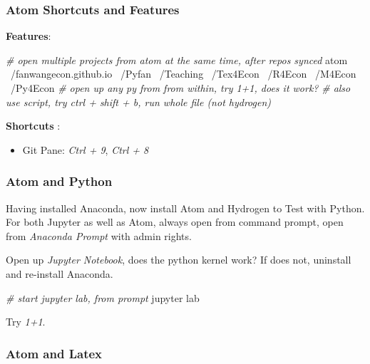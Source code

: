 \documentclass[]{article}
\newenvironment{Shaded}{\begin{snugshade}}{\end{snugshade}}
\newcommand{\CommentTok}[1]{\textcolor[rgb]{0.56,0.35,0.01}{\textit{#1}}}
\newcommand{\ExtensionTok}[1]{#1}
\newcommand{\NormalTok}[1]{#1}
\providecommand{\tightlist}{%
  \setlength{\itemsep}{0pt}\setlength{\parskip}{0pt}}
\begin{document}
\hypertarget{atom-shortcuts-and-features}{%
\subsubsection{Atom Shortcuts and
Features}\label{atom-shortcuts-and-features}}

\textbf{Features}:

\begin{Shaded}
\begin{Highlighting}[]
\CommentTok{# open multiple projects from atom at the same time, after repos synced}
\ExtensionTok{atom}\NormalTok{ ~/fanwangecon.github.io ~/Pyfan ~/Teaching ~/Tex4Econ ~/R4Econ ~/M4Econ ~/Py4Econ}
\CommentTok{# open up any py from from within, try 1+1, does it work?}
\CommentTok{# also use script, try ctrl + shift + b, run whole file (not hydrogen)}
\end{Highlighting}
\end{Shaded}

\textbf{Shortcuts} :

\begin{itemize}
\tightlist
\item
  Git Pane: \emph{Ctrl + 9}, \emph{Ctrl + 8}
\end{itemize}

\hypertarget{atom-and-python}{%
\subsubsection{Atom and Python}\label{atom-and-python}}

Having installed Anaconda, now install Atom and Hydrogen to Test with
Python. For both Jupyter as well as Atom, always open from command
prompt, open from \emph{Anaconda Prompt} with admin rights.

Open up \emph{Jupyter Notebook}, does the python kernel work? If does
not, uninstall and re-install Anaconda.

\begin{Shaded}
\begin{Highlighting}[]
\CommentTok{# start jupyter lab, from prompt}
\ExtensionTok{jupyter}\NormalTok{ lab}
\end{Highlighting}
\end{Shaded}

Try \emph{1+1}.

\hypertarget{atom-and-latex}{%
\subsubsection{Atom and Latex}\label{atom-and-latex}}
\end{document}

